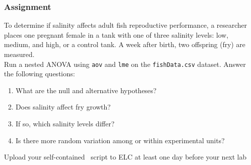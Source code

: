 \documentclass[color=usenames,dvipsnames]{beamer}\usepackage[]{graphicx}\usepackage[]{color}
\newcommand{\inr}[1]{\colorbox{inlinecolor}{\texttt{#1}}}
\begin{document}
\begin{frame}[fragile]
  \frametitle{Assignment}
  \small
  To determine if salinity affects adult fish reproductive
  performance, a researcher places one pregnant female in a tank with
  one of three salinity levels: low, medium, and high, or a control
  tank. A week after birth, two offspring (fry) are measured. \\
  \vfill
  Run a nested ANOVA using \inr{aov} and \inr{lme} on the
  {\tt fishData.csv} dataset. Answer the following questions:
\begin{enumerate}[\bf (1)]
  \item What are the null and alternative hypotheses?
  \item Does salinity affect fry growth?
  \item If so, which salinity levels differ?
  \item Is there more random variation among or within experimental units?
\end{enumerate}

\vfill
\centering
Upload your self-contained \R~script to ELC at least one
day before your next lab \\
\end{frame}
\end{document}
